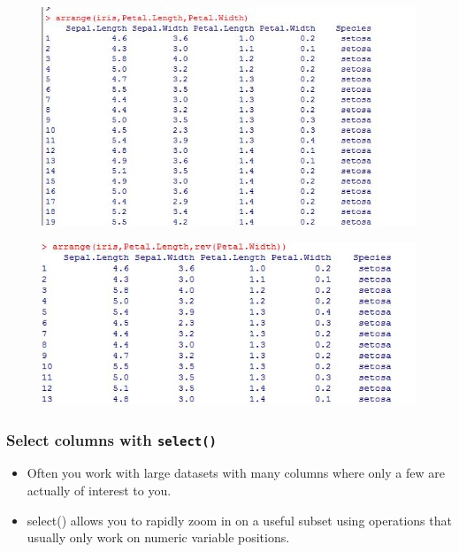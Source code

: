 \documentclass{beamer}
\begin{document}
	\begin{frame}
		\begin{figure}
			\centering
			\includegraphics[width=0.97\linewidth]{images/irisarrange}
			
		\end{figure}
		
	\end{frame}
	
	
	\begin{frame}
		\begin{figure}
			\centering
			\includegraphics[width=0.97\linewidth]{images/irisarrange2}
			
		\end{figure}
		
	\end{frame}
	
	
	\begin{frame}
		\frametitle{Select columns with \texttt{select()}}
		\begin{itemize}
			\item Often you work with large datasets with many columns where only a few are actually of interest to you. 
			\item select() allows you to rapidly zoom in on a useful subset using operations that usually only work on numeric variable positions.
		\end{itemize}
	\end{frame}
	
\end{document}

